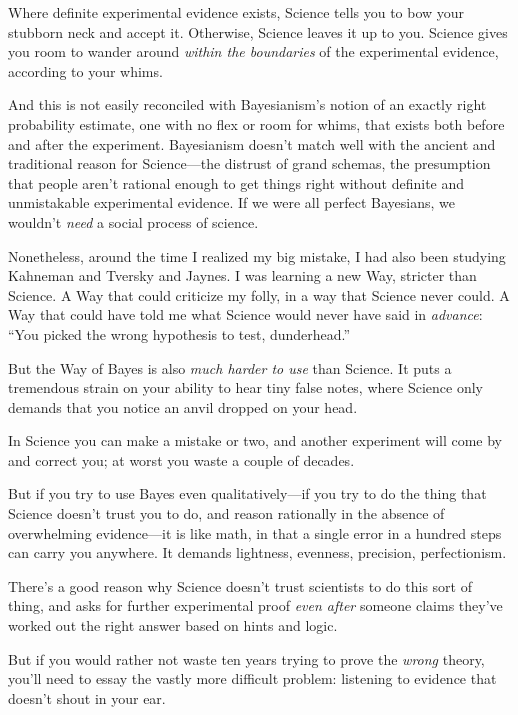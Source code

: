 {
 Where definite experimental evidence exists, Science tells you to
bow your stubborn neck and accept it. Otherwise, Science leaves it up
to you. Science gives you room to wander around \textit{within the
boundaries} of the experimental evidence, according to your whims.}

{
 And this is not easily reconciled with
Bayesianism's notion of an exactly right probability
estimate, one with no flex or room for whims, that exists both before
and after the experiment. Bayesianism doesn't match
well with the ancient and traditional reason for Science---the distrust
of grand schemas, the presumption that people aren't
rational enough to get things right without definite and unmistakable
experimental evidence. If we were all perfect Bayesians, we
wouldn't \textit{need} a social process of science.}

{
 Nonetheless, around the time I realized my big mistake, I had also
been studying Kahneman and Tversky and Jaynes. I was learning a new
Way, stricter than Science. A Way that could criticize my folly, in a
way that Science never could. A Way that could have told me what
Science would never have said in \textit{advance}:
``You picked the wrong hypothesis to test,
dunderhead.''}

{
 But the Way of Bayes is also \textit{much harder to use} than
Science. It puts a tremendous strain on your ability to hear tiny false
notes, where Science only demands that you notice an anvil dropped on
your head.}

{
 In Science you can make a mistake or two, and another experiment
will come by and correct you; at worst you waste a couple of decades.}

{
 But if you try to use Bayes even qualitatively---if you try to do
the thing that Science doesn't trust you to do, and
reason rationally in the absence of overwhelming evidence---it is like
math, in that a single error in a hundred steps can carry you anywhere.
It demands lightness, evenness, precision, perfectionism.}

{
 There's a good reason why Science
doesn't trust scientists to do this sort of thing, and
asks for further experimental proof \textit{even after} someone claims
they've worked out the right answer based on hints and
logic.}

{
 But if you would rather not waste ten years trying to prove the
\textit{wrong} theory, you'll need to essay the vastly
more difficult problem: listening to evidence that
doesn't shout in your ear.}

